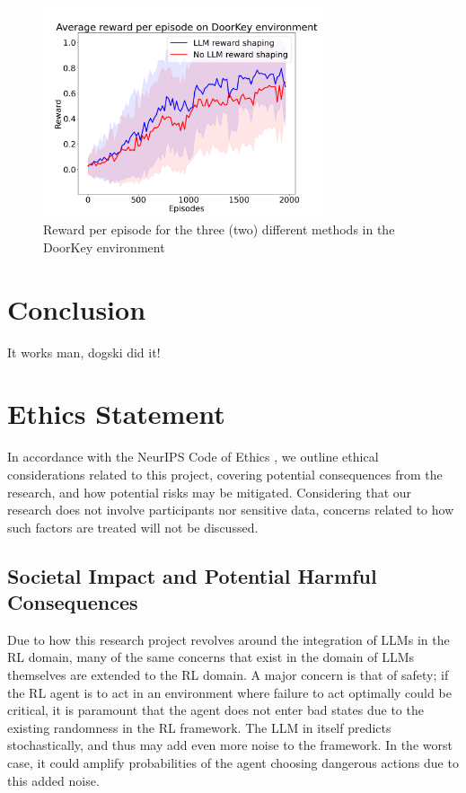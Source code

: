 \documentclass[conference]{IEEEtran}
\begin{document}
\begin{figure}[h]
\centerline{\includegraphics[width=3.25in]{figure/doorkeyresults.png}}
\caption{Reward per episode for the three (two) different methods in the DoorKey environment}
\label{doorkeyresults}
\end{figure}


\section{Conclusion}

It works man, dogski did it!

\section*{Ethics Statement}

In accordance with the NeurIPS Code of Ethics \cite{ethics}, we outline ethical considerations related to this project, covering potential consequences from the research, and how potential risks may be mitigated. Considering that our research does not involve participants nor sensitive data, concerns related to how such factors are treated will not be discussed.

\subsection{Societal Impact and Potential Harmful Consequences}

Due to how this research project revolves around the integration of LLMs in the RL domain, many of the same concerns that exist in the domain of LLMs themselves are extended to the RL domain. A major concern is that of safety; if the RL agent is to act in an environment where failure to act optimally could be critical, it is paramount that the agent does not enter bad states due to the existing randomness in the RL framework. The LLM in itself predicts stochastically, and thus may add even more noise to the framework. In the worst case, it could amplify probabilities of the agent choosing dangerous actions due to this added noise.
\end{document}
